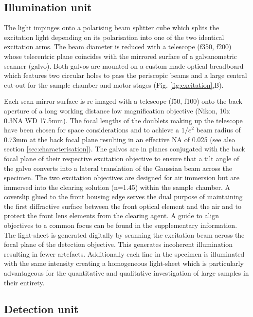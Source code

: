 \documentclass[12pt]{spieman}  %
\begin{document}
\begin{spacing}{2}
\subsection{Illumination unit}		
The light impinges onto a polarising beam splitter cube which splits the excitation light depending on its polarisation into one of the two identical excitation arms. The beam diameter is reduced with a telescope (f350, f200) whose telecentric plane coincides with the mirrored surface of a galvanometric scanner (galvo). Both galvos are mounted on a custom made optical breadboard which features two circular holes to pass the periscopic beams and a large central cut-out for the sample chamber and motor stages (Fig. \ref{fig:excitation},B). 

Each scan mirror surface is re-imaged with a telescope (f50, f100) onto the back aperture of a long working distance low magnification objective (Nikon, 10x 0.3NA WD 17.5mm). The focal lengths of the doublets making up the telescope have been chosen for space considerations and to achieve a $1/e^2$ beam radius of 0.73mm at the back focal plane resulting in an effective NA of 0.025 (see also section \ref{sec:characterisation}). The galvos are in planes conjugated with the back focal plane of their respective excitation objective to ensure that a tilt angle of the galvo converts into a lateral translation of the Gaussian beam across the specimen. The two excitation objectives are designed for air immersion but are immersed into the clearing solution (n=1.45) within the sample chamber. A coverslip glued to the front housing edge serves the dual purpose of maintaining the first diffractive surface between the front optical element and the air and to protect the front lens elements from the clearing agent. A guide to align objectives to a common focus can be found in the supplementary information. The light-sheet is generated digitally\cite{Keller2008a,Keller2008b} by scanning the excitation beam across the focal plane of the detection objective. This generates incoherent illumination resulting in fewer artefacts. Additionally each line in the specimen is illuminated with the same intensity creating a homogeneous light-sheet which is particularly advantageous for the quantitative and qualitative investigation of large samples in their entirety.

\subsection{Detection unit}
			 

\end{spacing}
\end{document}
